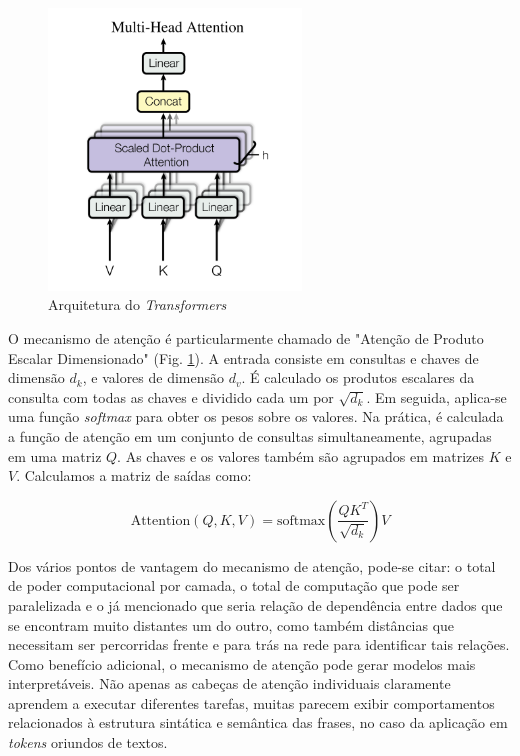 \begin{figure}[htbp]
    \centering
    \includegraphics[width=0.6\textwidth]{figures/fig005.png}
    \caption{Arquitetura do \textit{Transformers}}
    \label{fig:fig005}
\end{figure}

O mecanismo de atenção é particularmente chamado de "Atenção de Produto Escalar Dimensionado" (Fig. \ref{fig:fig005}). A entrada consiste em consultas e chaves de dimensão $d_{k}$, e valores de dimensão $d_{v}$. É calculado os produtos escalares da consulta com todas as chaves e dividido cada um por $\sqrt{d_{k}}$. Em seguida, aplica-se uma função \textit{softmax} para obter os pesos sobre os valores. Na prática, é calculada a função de atenção em um conjunto de consultas simultaneamente, agrupadas em uma matriz $Q$. As chaves e os valores também são agrupados em matrizes $K$ e $V$. Calculamos a matriz de saídas como:

\begin{equation}
\text{Attention}(Q, K, V) = \text{softmax}\left(\frac{QK^T}{\sqrt{d_k}}\right)V
\label{eq:attention}
\end{equation}

Dos vários pontos de vantagem do mecanismo de atenção, pode-se citar: o total de poder computacional por camada, o total de computação que pode ser paralelizada e o já mencionado que seria relação de dependência entre dados que se encontram muito distantes um do outro, como também distâncias que necessitam ser percorridas frente e para trás na rede para identificar tais relações. Como benefício adicional, o mecanismo de atenção pode gerar modelos mais interpretáveis. Não apenas as cabeças de atenção individuais claramente aprendem a executar diferentes tarefas, muitas parecem exibir comportamentos relacionados à estrutura sintática e semântica das frases, no caso da aplicação em \textit{tokens} oriundos de textos.

